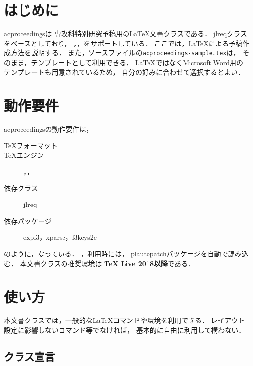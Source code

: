 \documentclass[uplatex, dvipdfmx, fonts=default]{acproceedings}
\begin{document}
\maketitle

\section{はじめに}

\textsf{acproceedings}は
専攻科特別研究予稿用の{\LaTeX}文書クラスである．
\textsf{jlreq}クラスをベースとしており，
{\pLaTeX}，{\upLaTeX}，{\LuaLaTeX}をサポートしている．
ここでは，{\LaTeX}による予稿作成方法を説明する．
また，ソースファイルの\texttt{acproceedings-sample.tex}は，
そのまま，テンプレートとして利用できる．
{\LaTeX}ではなくMicrosoft Word用のテンプレートも用意されているため，
自分の好みに合わせて選択するとよい．

\section{動作要件}

\textsf{acproceedings}の動作要件は，
\begin{description}
	\item[{\TeX}フォーマット] {\LaTeXe}
	\item[{\TeX}エンジン]     {\pLaTeX}，{\upLaTeX}，{\LuaLaTeX}
	\item[依存クラス]         \textsf{jlreq}
	\item[依存パッケージ]     \textsf{expl3}，\textsf{xparse}，\textsf{l3keys2e}
\end{description}
のように，なっている．
{\pLaTeX}，{\upLaTeX}利用時には，
\textsf{plautopatch}パッケージを自動で読み込む．
本文書クラスの推奨環境は
\textbf{\textsf{{\TeX} Live 2018以降}}である．

\section{使い方}

本文書クラスでは，一般的な{\LaTeX}コマンドや環境を利用できる．
レイアウト設定に影響しないコマンド等でなければ，
基本的に自由に利用して構わない．

\subsection{クラス宣言}
\end{document}
